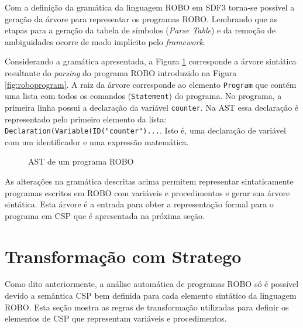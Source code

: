 Com a definição da gramática da linguagem ROBO em SDF3 torna-se possível a geração da árvore para representar os programas ROBO. Lembrando que as etapas para a geração da tabela de símbolos (\textit{Parse Table}) e da remoção de ambiguidades ocorre de modo implícito pelo \textit{framework}.

Considerando a gramática apresentada, a Figura \ref{fig:ast1} corresponde a árvore sintática resultante do \textit{parsing} do programa ROBO introduzido na Figura \ref{fig:roboprogram}. A raiz da árvore corresponde ao elemento \texttt{Program} que contém uma lista com todos os comandos (\texttt{Statement}) do programa. No programa, a primeira linha possui a declaração da variável \texttt{counter}. Na AST essa declaração é representado pelo primeiro elemento da lista: \texttt{Declaration(Variable(ID("counter")...}. Isto é, uma declaração de variável com um identificador e uma expressão matemática.

\begin{figure}[h]
\centering
\caption{AST de um programa ROBO}

\label{fig:ast1}
\end{figure}

As alterações na gramática descritas acima permitem representar sintaticamente programas escritos em ROBO com variáveis e procedimentos e gerar sua árvore sintática. Esta árvore é a entrada para obter a representação formal para o programa em CSP que é apresentada na próxima seção.

\section{Transformação com Stratego}


Como dito anteriormente, a análise automática de programas ROBO só é possível devido a semântica CSP bem definida para cada elemento sintático da linguagem ROBO. Esta seção mostra as regras de transformação utilizadas para definir os elementos de CSP que representam variáveis e procedimentos. 

